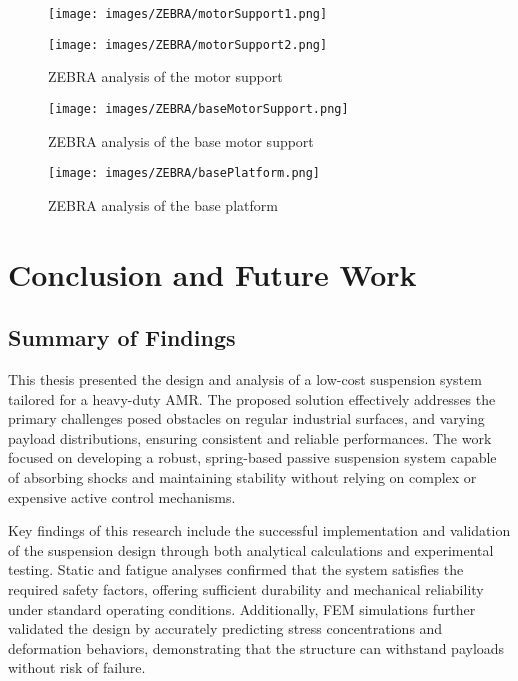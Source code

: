 \documentclass[11pt]{article}
\begin{document}
\begin{figure}[H]
    \centering
    \begin{minipage}{0.45\textwidth}
        \texttt{[image: images/ZEBRA/motorSupport1.png]}
        \label{fig:zebra_motor_support}
    \end{minipage}
    \hfill
    \begin{minipage}{0.45\textwidth}
        \texttt{[image: images/ZEBRA/motorSupport2.png]}
        \label{fig:zebra_motor_support2}
    \end{minipage}
    \caption{ZEBRA analysis of the motor support}
\end{figure}

\begin{figure}[H]
    \centering
    \texttt{[image: images/ZEBRA/baseMotorSupport.png]}
    \caption{ZEBRA analysis of the base motor support}
    \label{fig:zebra_base_motor_support}
\end{figure}

\begin{figure}[H]
    \centering
    \texttt{[image: images/ZEBRA/basePlatform.png]}
    \caption{ZEBRA analysis of the base platform}
    \label{fig:zebra_base_platform}
\end{figure}

   
\newpage

\section{Conclusion and Future Work}
\subsection{Summary of Findings}
This thesis presented the design and analysis of a low-cost suspension system tailored for a heavy-duty AMR. The proposed solution effectively addresses the primary challenges posed obstacles on regular industrial surfaces, and varying payload distributions, ensuring consistent and reliable performances. The work focused on developing a robust, spring-based passive suspension system capable of absorbing shocks and maintaining stability without relying on complex or expensive active control mechanisms.

Key findings of this research include the successful implementation and validation of the suspension design through both analytical calculations and experimental testing. Static and fatigue analyses confirmed that the system satisfies the required safety factors, offering sufficient durability and mechanical reliability under standard operating conditions. Additionally, 
FEM simulations further validated the design by accurately predicting stress concentrations and deformation behaviors, demonstrating that the structure can withstand payloads without risk of failure.
\end{document}
